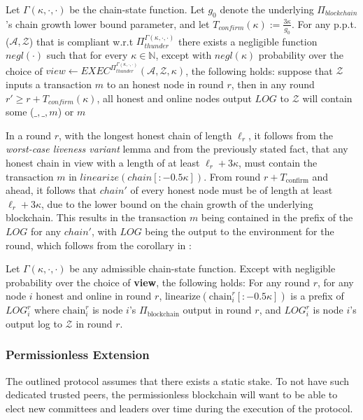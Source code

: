 \begin{theorem}
Let $\Gamma(\kappa, \cdot, \cdot)$ be the chain-state function. Let $g_0$ denote the underlying $\Pi_{blockchain}$'s chain growth lower bound parameter, and let $T_{confirm}(\kappa) := \frac{3\kappa}{g_0}$. For any p.p.t. ($\mathcal{A}, \mathcal{Z}$) that is compliant w.r.t $\Pi_{thunder}^{\Gamma(\kappa, \cdot, \cdot)}$ there exists a negligible function $negl(\cdot)$ such that for every $\kappa \in \mathbb{N}$, except with $negl(\kappa)$ probability over the choice of $view \xleftarrow{} EXEC^{\Pi_{thunder}^{\Gamma(\kappa, \cdot, \cdot)}}(\mathcal{A}, \mathcal{Z}, \kappa)$, the following holds: suppose that $\mathcal{Z}$ inputs a transaction $m$ to an honest node in round $r$, then in any round $r' \geq r + T_{confirm}(\kappa)$, all honest and online nodes output $LOG$ to $\mathcal{Z}$ will contain some ($\_,\_,m$) or $m$
\end{theorem}

In a round $r$, with the longest honest chain of length $\ell_r$, it follows from the \emph{worst-case liveness variant} lemma and from the previously stated fact, that any honest chain in view with a length of at least $\ell_r + 3\kappa$, must contain the transaction $m$ in $linearize(chain[: -0.5\kappa])$. From round $r+T_\text{confirm}$ and ahead, it follows that $chain'$ of every honest node must be of length at least $\ell_r + 3\kappa$, due to the lower bound on the chain growth of the underlying blockchain. This results in the transaction $m$ being contained in the prefix of the $LOG$ for any $chain'$, with $LOG$ being the output to the environment for the round, which follows from the corollary in \cite{thunderella}: 

\begin{corollary}
Let $\Gamma(\kappa, \cdot, \cdot)$ be any admissible chain-state function. Except with negligible probability over the choice of \textbf{view}, the following holds: For any round $r$, for any node $i$ honest and online in round $r$, $\text{linearize}(\text{chain}^r_i[:-0.5\kappa])$ is a prefix of $LOG_i^r$ where $\text{chain}_i^r$ is node $i$'s $\Pi_\text{blockchain}$ output in round $r$, and $LOG_i^r$ is node $i$'s output log to $\mathcal{Z}$ in round $r$.
\end{corollary}

\subsubsection*{Permissionless Extension}
The outlined protocol assumes that there exists a static stake. To not have such dedicated trusted peers, the permissionless blockchain will want to be able to elect new committees and leaders over time during the execution of the protocol.

